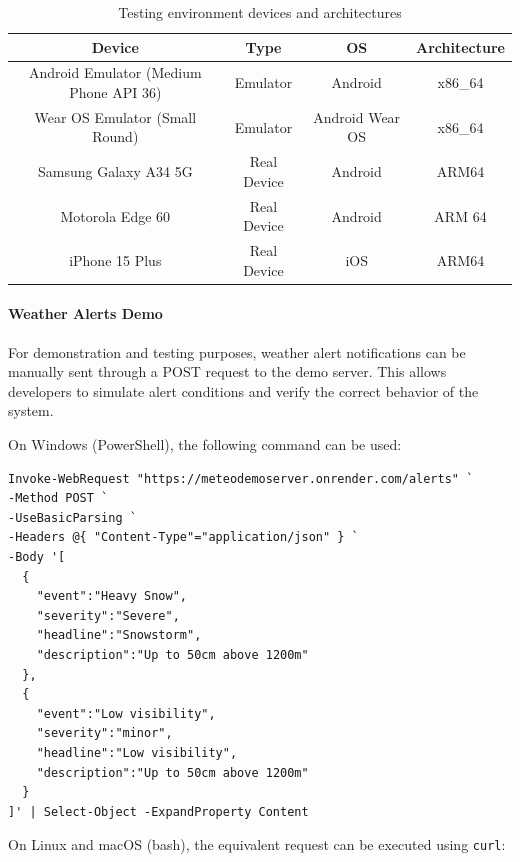 \begin{table}[h]
\centering
\begin{tabular}{|c|c|c|c|}
\hline
\textbf{Device} & \textbf{Type} & OS & \textbf{Architecture} \\
\hline
Android Emulator (Medium Phone API 36) & Emulator & Android & x86\_64 \\
Wear OS Emulator (Small Round) & Emulator & Android Wear OS & x86\_64 \\
Samsung Galaxy A34 5G & Real Device & Android & ARM64 \\
Motorola Edge 60 &  Real Device & Android & ARM 64 \\
iPhone 15 Plus & Real Device & iOS & ARM64 \\
\hline
\end{tabular}
\caption{Testing environment devices and architectures}
\label{tab:test-environment}
\end{table}







\newpage
\paragraph{Weather Alerts Demo}

For demonstration and testing purposes, weather alert notifications can be manually sent through a POST request to the demo server. This allows developers to simulate alert conditions and verify the correct behavior of the system.

On Windows (PowerShell), the following command can be used:

{\small
\begin{verbatim}
Invoke-WebRequest "https://meteodemoserver.onrender.com/alerts" `
-Method POST `
-UseBasicParsing `
-Headers @{ "Content-Type"="application/json" } `
-Body '[
  {
    "event":"Heavy Snow",
    "severity":"Severe",
    "headline":"Snowstorm",
    "description":"Up to 50cm above 1200m"
  },
  {
    "event":"Low visibility",
    "severity":"minor",
    "headline":"Low visibility",
    "description":"Up to 50cm above 1200m"
  }
]' | Select-Object -ExpandProperty Content
\end{verbatim}
}

On Linux and macOS (bash), the equivalent request can be executed using \texttt{curl}:





